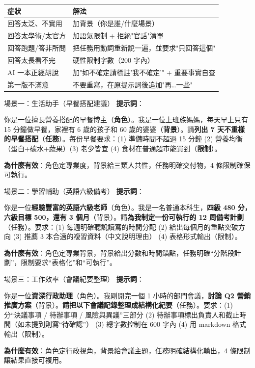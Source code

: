 
\begin{center}
\begin{tabularx}{\linewidth}{|X|X|}
\hline
\textbf{症狀} & \textbf{解法} \tabularnewline
\hline
回答太泛、不實用 & 加背景（你是誰/什麼場景） \tabularnewline
回答太學術/太官方 & 加語氣限制 + 拒絕"官話"清單 \tabularnewline
回答跑題/答非所問 & 把任務用動詞重新說一遍，並要求"只回答這個" \tabularnewline
回答太長看不完 & 硬性限制字數（200 字內） \tabularnewline
AI 一本正經胡說 & 加"如不確定請標註'我不確定'" + 重要事實自查 \tabularnewline
第一版不滿意 & 不要重寫，在原提示詞後追加"再…一些" \tabularnewline
\hline
\end{tabularx}
\end{center}


\begin{tcbinfo}{場景一：生活助手（早餐搭配建議）}
\textbf{提示詞}：

你是一位擅長營養搭配的早餐博主（\textbf{角色}）。我是一位上班族媽媽，每天早上只有 15 分鐘做早餐，家裡有 6 歲的孩子和 60 歲的婆婆（\textbf{背景}）。請\textbf{列出 7 天不重樣的早餐搭配}（\textbf{任務}）。每份早餐要求：(1) 準備時間不超過 15 分鐘 (2) 營養均衡（蛋白+碳水+蔬果）(3) 老少皆宜 (4) 食材在普通超市能買到（\textbf{限制}）。

\textbf{為什麼有效}：角色定專業度，背景給三類人共性，任務明確交付物，4 條限制確保可執行。

\end{tcbinfo}

\begin{tcbinfo}{場景二：學習輔助（英語六級備考）}
\textbf{提示詞}：

你是一位\textbf{經驗豐富的英語六級老師}（角色）。我是一名普通本科生，\textbf{四級 480 分，六級目標 500，還有 3 個月}（背景）。請\textbf{為我制定一份可執行的 12 周備考計劃}（任務）。要求：(1) 每週明確聽說讀寫的時間分配 (2) 給出每個月的重點突破方向 (3) 推薦 3 本合適的複習資料（中文說明理由） (4) 表格形式輸出（限制）。

\textbf{為什麼有效}：角色定專業背景，背景給出分數和時間錨點，任務明確“分階段計劃”，限制要求“表格化”和“可執行”。

\end{tcbinfo}

\begin{tcbinfo}{場景三：工作效率（會議紀要整理）}
\textbf{提示詞}：

你是一位\textbf{資深行政助理}（角色）。我剛開完一個 1 小時的部門會議，\textbf{討論 Q2 營銷推廣方案}（背景）。\textbf{請把以下會議記錄整理成結構化紀要}（任務）。要求：(1) 分“決議事項 / 待辦事項 / 風險與異議”三部分 (2) 待辦事項標出負責人和截止時間（如未提到則寫“待確認”） (3) 總字數控制在 600 字內 (4) 用 markdown 格式輸出（限制）。

\textbf{為什麼有效}：角色定行政視角，背景給會議主題，任務明確結構化輸出，4 條限制讓結果直接可複用。

\end{tcbinfo}

